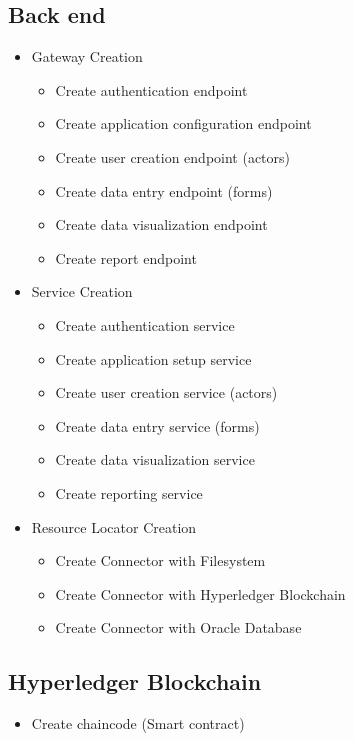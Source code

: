 \subsection{Back end}\label{sec:BackendActivities}
\begin{itemize}
\item Gateway Creation
    \begin{itemize}
    \item Create authentication endpoint
    \item Create application configuration endpoint
    \item Create user creation endpoint (actors)
    \item Create data entry endpoint (forms)
    \item Create data visualization endpoint
    \item Create report endpoint
    \end{itemize}
\item Service Creation
    \begin{itemize}
    \item Create authentication service
    \item Create application setup service
    \item Create user creation service (actors)
    \item Create data entry service (forms)
    \item Create data visualization service
    \item Create reporting service
    \end{itemize}
\item Resource Locator Creation
    \begin{itemize}
    \item Create Connector with Filesystem
    \item Create Connector with Hyperledger Blockchain
    \item Create Connector with Oracle Database
    \end{itemize}
\end{itemize}

\subsection{Hyperledger Blockchain}\label{sec:HyperledgerBlockchain}
\begin{itemize}
\item Create chaincode (Smart contract)
\end{itemize}
